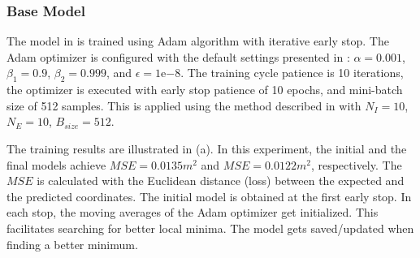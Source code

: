 \subsubsection{Base Model}
The model in  is trained using Adam algorithm with iterative early stop. The Adam optimizer is configured with the default settings presented in \cite{kingma2014adam}: $\alpha = 0.001$, $\beta_1 = 0.9$, $\beta_2 = 0.999$, and $\epsilon = 1\mathrm{e}{-8}$. The training cycle patience is 10 iterations, the optimizer is executed with early stop patience of 10 epochs, and mini-batch size of 512 samples. This is applied using the method described in  with $N_I = 10$, $N_E=10$, $B_{size}=512$.

The training results are illustrated in (a). In this experiment, the initial and the final models achieve $MSE=0.0135m^2$ and $MSE=0.0122m^2$, respectively. The $MSE$ is calculated with the Euclidean distance (loss) between the expected and the predicted coordinates. The initial model is obtained at the first early stop. In each stop, the moving averages of the Adam optimizer get initialized. This facilitates searching for better local minima. The model gets saved/updated when finding a better minimum.

